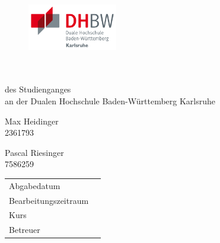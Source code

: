 \singlespacing

\thispagestyle{empty}
\begin{titlepage}

\begin{figure}           %
	\begin{minipage}{0.49\textwidth}
	\end{minipage}
	\hfill
	\begin{minipage}{0.49\textwidth}
		\flushright
		\includegraphics[height=2cm]{images/logos/Logo_DHBW.pdf} 
	\end{minipage}
\end{figure} 
\vspace*{1.0cm}

\begin{center}
	\huge{\thetitle}\\[3cm]
	\Large{\textsc{\arbeit}}\\[1cm]
	\normalsize{des Studienganges \studiengang}\\[1ex]
	\normalsize{an der Dualen Hochschule Baden-Württemberg Karlsruhe}\\[3cm]
\end{center}

\begin{center}
\begin{minipage}{0.35\textwidth}
	\centering
	\Large{Max Heidinger}\\
	\normalsize{2361793}
\end{minipage}
\begin{minipage}{0.35\textwidth}
	\centering
	\Large{Pascal Riesinger}\\
	\normalsize{7586259}
\end{minipage}
\end{center}
\vspace*{3em}

\begin{center}
	\vfill
	\setlength\tabcolsep{3em}
	\begin{tabular}{ll}
		Abgabedatum                     & \abgabe \\[0.2cm]
		Bearbeitungszeitraum            & \bearbeitungszeitraum \\[0.2cm]
		Kurs            								& \kurs \\[0.2cm]
		Betreuer 											  & \betreuerDhbw \\[0.2cm]
	\end{tabular} 
\end{center}

\restoregeometry
\end{titlepage}

\onehalfspacing